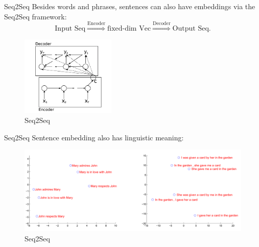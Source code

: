 \documentclass{beamer}
\begin{document}
\begin{frame}{Seq2Seq}
	Besides words and phrases, sentences can also have embeddings via the Seq2Seq framework:
	\begin{equation}
		\text{Input Seq} \overset{\text{Encoder}}{\Longrightarrow} \text{fixed-dim Vec} \overset{\text{Decoder}}{\Longrightarrow} \text{Output Seq}.
	\end{equation}
	\begin{figure}
		\centering
		\includegraphics[width=0.4\textwidth]{fig/Seq2Seq_arch.jpg}
		\caption{Seq2Seq}
	\end{figure}
\end{frame}

\begin{frame}{Seq2Seq}
	Sentence embedding also has linguistic meaning:
	\begin{figure}
		\centering
		\includegraphics[width=\textwidth]{fig/Seq2Seq.jpg}
		\caption{Seq2Seq}
	\end{figure}
\end{frame}
\end{document}
